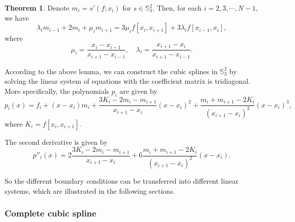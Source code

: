 \documentclass[a4paper]{article}
\theoremstyle{definition}
\newtheorem{theorem}{Theorem}
\begin{document}
\begin{theorem}
  Denote $m_i = s'(f; x_i)$ for $s \in \mathbb{S}_3^2$. Then, for each $i = 2, 3, \cdots, N - 1$, we have 
  \begin{equation}
    \lambda_i m_{i - 1} + 2m_i + \mu_i m_{i + 1} = 3\mu_i f[x_i, x_{i + 1}] + 3\lambda_i f[x_{i - 1}, x_i],
    \label{eq:pp-form-spline-tridiagonal}
  \end{equation}
  where 
  \begin{equation}
    \mu_i = \frac{x_i - x_{i - 1}}{x_{i + 1} - x_{i - 1}}, \quad \lambda_i = \frac{x_{i + 1} - x_i}{x_{i + 1} - x_{i - 1}}.
    \label{eq:pp-form-spline-coefficients}
  \end{equation}
\end{theorem}

According to the above lemma, we can construct the cubic splines in $\mathbb{S}_3^2$ by solving the linear system of equations with the coefficient matrix is tridiagonal. 
More specifically, the polynomials $p_i$ are given by 
\begin{equation}
  p_i(x) = f_i + (x - x_i)m_i + \frac{3K_i - 2m_i - m_{i + 1}}{x_{i + 1} - x_i} (x - x_i)^2 + \frac{m_i + m_{i + 1} - 2K_i}{(x_{i + 1} - x_i)^2} (x - x_i)^3,
  \label{eq:pp-form-spline-polynomial}
\end{equation}
where $K_i = f[x_i, x_{i + 1}]$.

The second derivative is given by 
\begin{equation}
  p''_{i}(x) = 2\frac{3K_i - 2m_i - m_{i + 1}}{x_{i + 1} - x_i} + 6\frac{m_i + m_{i + 1} - 2K_i}{(x_{i + 1} - x_i)^2}(x - x_i).
  \label{eq:pp-form-spline-second-derivative}
\end{equation}

So the different boundary conditions can be transferred into different linear systems, which are illustrated in the following sections.

\subsubsection{Complete cubic spline}
\end{document}
